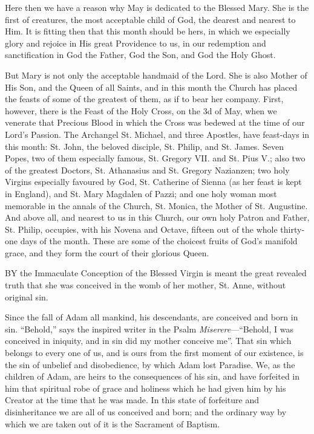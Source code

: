 Here then we have a reason why
May is dedicated to the Blessed Mary. She is the first of creatures, the
most acceptable child of God, the dearest and nearest to Him. It is
fitting then that this month should be hers, in which we especially
glory and rejoice in His great Providence to us, in our redemption and
sanctification in God the Father, God the Son, and God the Holy Ghost.

But Mary is not only the
acceptable handmaid of the Lord. She is also Mother of His Son, and the
Queen of all Saints, and in this month the Church has placed the feasts
of some of the greatest of them, as if to bear her company. First,
however, there is the Feast of the Holy Cross, on the 3d of May, when we
venerate that Precious Blood in which the Cross was bedewed at the time
of our Lord's Passion. The Archangel St. Michael, and three Apostles,
have feast-days in this month: St. John, the beloved disciple, St.
Philip, and St. James. Seven Popes, two of them especially famous, St.
Gregory VII. and St. Pius V.; also two of the greatest Doctors, St.
Athanasius and St. Gregory Nazianzen; two holy Virgins especially
favoured by God, St. Catherine of Sienna (as her feast is kept in
England), and St. Mary Magdalen of Pazzi; and one holy woman most
memorable in the annals of the Church, St. Monica, the Mother of St.
Augustine. And above all, and nearest to us in this Church, our own holy
Patron and Father, St. Philip, occupies, with his Novena and Octave,
fifteen out of the whole thirty-one days of the month. These are some of
the choicest fruits of God's manifold grace, and they form the court of
their glorious Queen.



BY
the Immaculate Conception of the Blessed Virgin is meant the great
revealed truth that she was conceived in the womb of her mother, St.
Anne, without original sin.

Since the fall of Adam all
mankind, his descendants, are conceived and born in sin. ``Behold,'' says
the inspired writer in the Psalm \emph{Miserere}—``Behold, I was
conceived in iniquity, and in sin did my mother conceive me''. That sin
which belongs to every one of us, and is ours from the first moment of
our existence, is the sin of unbelief and disobedience, by which Adam
lost Paradise. We, as the children of Adam, are heirs to the
consequences of his sin, and have forfeited in him that spiritual robe
of grace and holiness which he had given him by his Creator at the time
that he was made. In this state of forfeiture and disinheritance we
are all of us conceived and born; and the ordinary way by which we are
taken out of it is the Sacrament of Baptism.

